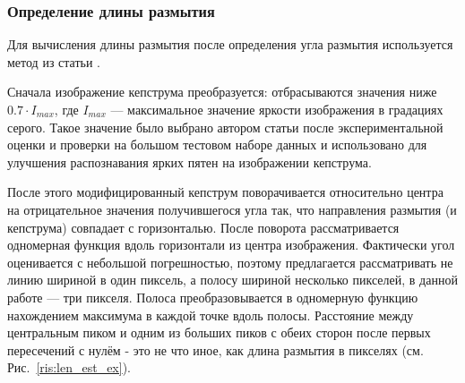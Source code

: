 \subsubsection{Определение длины размытия}
Для вычисления длины размытия после определения угла размытия используется метод из статьи \cite{novel}.

Сначала изображение кепструма преобразуется: отбрасываются значения ниже ${0.7 \cdot I_{max}}$, где $I_{max}$ --- максимальное значение яркости изображения в градациях серого. Такое значение было выбрано автором статьи после экспериментальной оценки и проверки на большом тестовом наборе данных и использовано для улучшения распознавания ярких пятен на изображении кепструма.

После этого модифицированный кепструм поворачивается относительно центра на отрицательное значения получившегося угла так, что направления размытия (и кепструма) совпадает с горизонталью. После поворота рассматривается одномерная функция вдоль горизонтали из центра изображения. Фактически угол оценивается с небольшой погрешностью, поэтому предлагается рассматривать не линию шириной в один пиксель, а полосу шириной несколько пикселей, в данной работе --- три пикселя. Полоса преобразовывается в одномерную функцию нахождением максимума в каждой точке вдоль полосы. Расстояние между центральным пиком и одним из больших пиков с обеих сторон после первых пересечений с нулём  - это не что иное, как длина размытия в пикселях (см. Рис.~\ref{ris:len_est_ex}).


